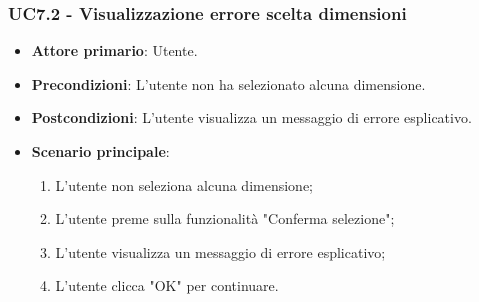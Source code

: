 \subsubsection{UC7.2 - Visualizzazione errore scelta dimensioni}
\begin{itemize}
	\item \textbf{Attore primario}: Utente.
	\item \textbf{Precondizioni}: L'utente non ha selezionato alcuna dimensione.
	\item \textbf{Postcondizioni}: L'utente visualizza un messaggio di errore esplicativo.
	\item \textbf{Scenario principale}:
		\begin{enumerate}
			\item L'utente non seleziona alcuna dimensione;
			\item L'utente preme sulla funzionalità "Conferma selezione";
			\item L'utente visualizza un messaggio di errore esplicativo;
			\item L'utente clicca "OK" per continuare.
		\end{enumerate}
\end{itemize}